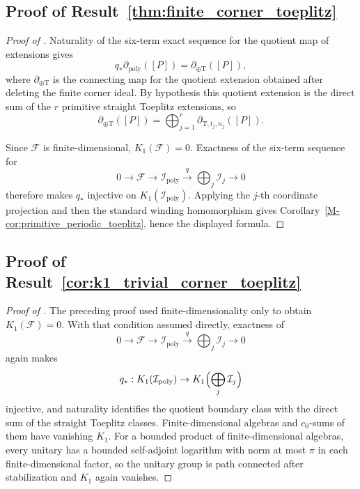 \documentclass[11pt]{article}
\numberwithin{equation}{section}
\theoremstyle{definition}
\theoremstyle{remark}
\begin{document}
\subsection{Proof of Result~\ref{thm:finite_corner_toeplitz}}\label{app:proof:thm:finite_corner_toeplitz}
\begin{proof}[Proof of ]
Naturality of the six-term exact sequence for the quotient map of extensions
\cite{BlackadarKTheory} gives
\[
q_*\partial_{\mathrm{poly}}([P])
=
\partial_{\oplus\mathrm T}([P]),
\]
where \(\partial_{\oplus\mathrm T}\) is the connecting map for the quotient extension obtained
after deleting the finite corner ideal. By hypothesis this quotient extension is the direct sum of
the \(r\) primitive straight Toeplitz extensions, so
\[
\partial_{\oplus\mathrm T}([P])
=
\bigoplus_{j=1}^r\partial_{\mathrm T,t_j,n_j}([P]).
\]

Since \(\mathcal F\) is finite-dimensional, \(K_1(\mathcal F)=0\). Exactness of the six-term
sequence for
\[
0\to\mathcal F\to\mathcal I_{\mathrm{poly}}\xrightarrow{q}\bigoplus_j\mathcal I_j\to0
\]
therefore makes \(q_*\) injective on \(K_1(\mathcal I_{\mathrm{poly}})\). Applying the \(j\)-th
coordinate projection and then the standard winding homomorphism gives
Corollary~\ref{M-cor:primitive_periodic_toeplitz}, hence the displayed formula.
\end{proof}

\subsection{Proof of Result~\ref{cor:k1_trivial_corner_toeplitz}}\label{app:proof:cor:k1_trivial_corner_toeplitz}
\begin{proof}[Proof of ]
The preceding proof used finite-dimensionality only to obtain \(K_1(\mathcal F)=0\). With that
condition assumed directly, exactness of
\[
0\to\mathcal F\to\mathcal I_{\mathrm{poly}}
\xrightarrow{q}\bigoplus_j\mathcal I_j\to0
\]
again makes
\[
q_*:K_1(\mathcal I_{\mathrm{poly}})\to K_1\Bigl(\bigoplus_j\mathcal I_j\Bigr)
\]
injective, and naturality identifies the quotient boundary class with the direct sum of the
straight Toeplitz classes. Finite-dimensional algebras and \(c_0\)-sums of them have vanishing
\(K_1\). For a bounded
product of finite-dimensional algebras, every unitary has a bounded self-adjoint logarithm with
norm at most \(\pi\) in each finite-dimensional factor, so the unitary group is path connected
after stabilization and \(K_1\) again vanishes.
\end{proof}
\end{document}
